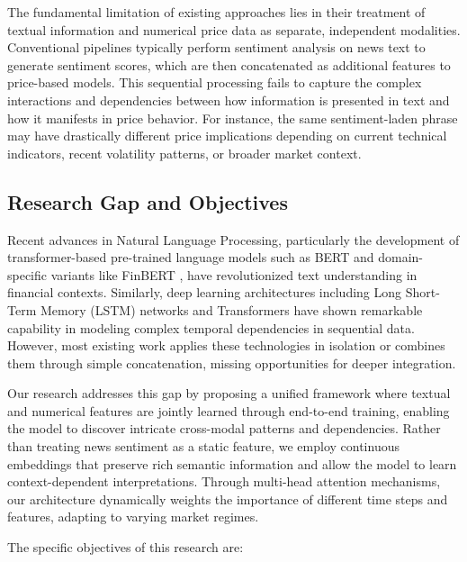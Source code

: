 \documentclass[conference]{IEEEtran}
\begin{document}
The fundamental limitation of existing approaches lies in their treatment of textual information and numerical price data as separate, independent modalities. Conventional pipelines typically perform sentiment analysis on news text to generate sentiment scores, which are then concatenated as additional features to price-based models. This sequential processing fails to capture the complex interactions and dependencies between how information is presented in text and how it manifests in price behavior. For instance, the same sentiment-laden phrase may have drastically different price implications depending on current technical indicators, recent volatility patterns, or broader market context.

\subsection{Research Gap and Objectives}

Recent advances in Natural Language Processing, particularly the development of transformer-based pre-trained language models such as BERT \cite{devlin2018bert} and domain-specific variants like FinBERT \cite{araci2019finbert}, have revolutionized text understanding in financial contexts. Similarly, deep learning architectures including Long Short-Term Memory (LSTM) networks \cite{hochreiter1997long} and Transformers \cite{vaswani2017attention} have shown remarkable capability in modeling complex temporal dependencies in sequential data. However, most existing work applies these technologies in isolation or combines them through simple concatenation, missing opportunities for deeper integration.

Our research addresses this gap by proposing a unified framework where textual and numerical features are jointly learned through end-to-end training, enabling the model to discover intricate cross-modal patterns and dependencies. Rather than treating news sentiment as a static feature, we employ continuous embeddings that preserve rich semantic information and allow the model to learn context-dependent interpretations. Through multi-head attention mechanisms, our architecture dynamically weights the importance of different time steps and features, adapting to varying market regimes.

The specific objectives of this research are:
\end{document}
